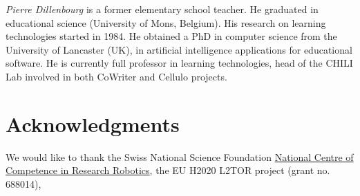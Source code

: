 \documentclass{sig-alternate-05-2015}
\begin{document}
\emph{Pierre Dillenbourg} is a former elementary school teacher. He graduated in educational science (University of Mons, Belgium). His research on learning technologies started in 1984. He obtained a PhD in computer science from the University of Lancaster (UK), in artificial intelligence applications for educational software. He is currently full professor in learning technologies, head of the CHILI Lab involved in both CoWriter and Cellulo projects.

\section{Acknowledgments}
We would like to thank the Swiss National Science Foundation 
\href{http://www.nccr-robotics.ch/}{National Centre of Competence in Research 
Robotics}, the EU H2020 L2TOR project (grant no. 688014),

\small

  
\end{document}
